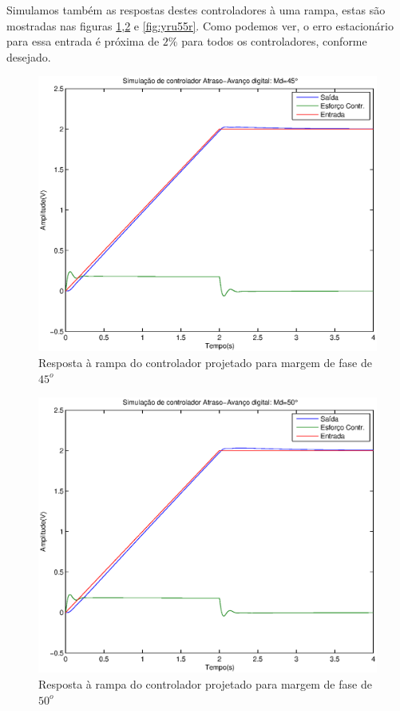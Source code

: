 \documentclass{article}
\begin{document}
Simulamos também as respostas destes controladores à uma rampa, estas são mostradas nas figuras \ref{fig:yru45r},\ref{fig:yru50r} e \ref{fig:yru55r}. Como podemos ver, o erro estacionário para essa entrada é próxima de $2\%$ para todos os controladores, conforme desejado.
\begin{figure}[H]
	\centering
	\includegraphics[width=0.8\linewidth]{yur45r}
	\caption{Resposta à rampa do controlador projetado para margem de fase de $45^o$}
	\label{fig:yru45r}
\end{figure}
\begin{figure}[H]
	\centering
	\includegraphics[width=0.8\linewidth]{yur50r}
	\caption{Resposta à rampa do controlador projetado para margem de fase de $50^o$}
	\label{fig:yru50r}
\end{figure}
\end{document}
